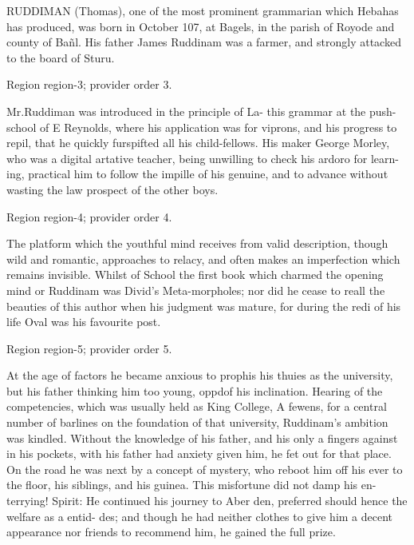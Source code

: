 \documentclass[11pt]{article}
\begin{document}
RUDDIMAN (Thomas), one of the most prominent grammarian which Hebahas has produced, was born in October 107, at Bagels, in the parish of Royode and county of Bañl. His father James Ruddinam was a farmer, and strongly attacked to the board of Sturu.
\par

{\scriptsize\color{gray} Region region-3; provider order 3.\par}
\medskip

Mr.Ruddiman was introduced in the principle of La- this grammar at the push-school of E Reynolds, where his application was for viprons, and his progress to repil, that he quickly furspifted all his child-fellows. His maker George Morley, who was a digital artative teacher, being unwilling to check his ardoro for learn-ing, practical him to follow the impille of his genuine, and to advance without wasting the law prospect of the other boys.
\par

{\scriptsize\color{gray} Region region-4; provider order 4.\par}
\medskip

The platform which the youthful mind receives from valid description, though wild and romantic, approaches to relacy, and often makes an imperfection which remains invisible. Whilst of School the first book which charmed the opening mind or Ruddinam was Divid’s Meta-morpholes; nor did he cease to reall the beauties of this author when his judgment was mature, for during the redi of his life Oval was his favourite post.
\par

{\scriptsize\color{gray} Region region-5; provider order 5.\par}
\medskip

At the age of factors he became anxious to prophis his thuies as the university, but his father thinking him too young, oppdof his inclination. Hearing of the competencies, which was usually held as King College, A fewens, for a central number of barlines on the foundation of that university, Ruddinam's ambition was kindled. Without the knowledge of his father, and his only a fingers against in his pockets, with his father had anxiety given him, he fet out for that place. On the road he was next by a concept of mystery, who reboot him off his ever to the floor, his siblings, and his guinea. This misfortune did not damp his en- terrying! Spirit: He continued his journey to Aber den, preferred should hence the welfare as a entid- des; and though he had neither clothes to give him a decent appearance nor friends to recommend him, he gained the full prize.
\par
\end{document}

